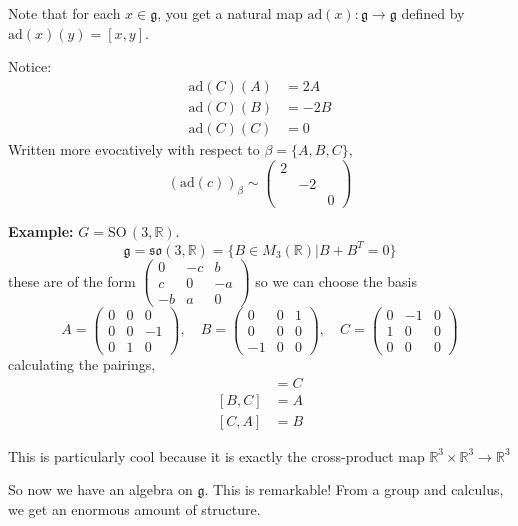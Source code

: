 \documentclass[12pt]{article}
\newcommand{\R}{\mathbb{R}}
\newcommand{\SO}{\text{SO}\,}
\newcommand{\g}{\mathfrak{g}}
\begin{document}
    Note that for each $x \in \g$, you get a natural map $\text{ad}(x): \g \to \g$ defined by $\text{ad}(x)(y) = [x, y]$. 

    Notice:
    \begin{align*}
        \text{ad}(C)(A) &= 2A\\ 
        \text{ad}(C)(B) &= -2B\\
        \text{ad}(C)(C) &= 0
    \end{align*}
    Written more evocatively with respect to $\beta = \{A, B, C\}$, 
    \[(\text{ad}(c))_{\beta} \sim \begin{pmatrix}
        2\\
        & -2\\ 
        & & 0
    \end{pmatrix}\]

    \textbf{Example:} $G = \SO(3, \R)$. 
    \[\g = \mathfrak{so}(3, \R) = \{B \in M_3(\R) \big\vert B + B^T = 0\}\]
    these are of the form $\begin{pmatrix}
        0 & -c & b\\ 
        c & 0 & -a\\ 
        -b & a & 0
    \end{pmatrix}$ so we can choose the basis 
    \[A = \begin{pmatrix}
        0 & 0 & 0\\ 
        0 & 0 & -1\\ 
        0 & 1 & 0
    \end{pmatrix}, \quad B = \begin{pmatrix}
        0 & 0 & 1\\ 
        0 & 0 & 0\\ 
        -1 & 0 & 0
    \end{pmatrix}, \quad C = \begin{pmatrix}
        0 & -1 & 0\\ 
        1 & 0 & 0\\ 
        0 & 0 & 0
    \end{pmatrix}\]
    calculating the pairings, 
    \begin{align*}
        [A, B] &= C\\ 
        [B, C] &= A\\ 
        [C, A] &= B 
    \end{align*}

    This is particularly cool because it is exactly the cross-product map $\R^3 \times \R^3 \to \R^3$

    So now we have an algebra on $\g$. This is remarkable! From a group and calculus, we get an enormous amount of structure. 
\end{document}
